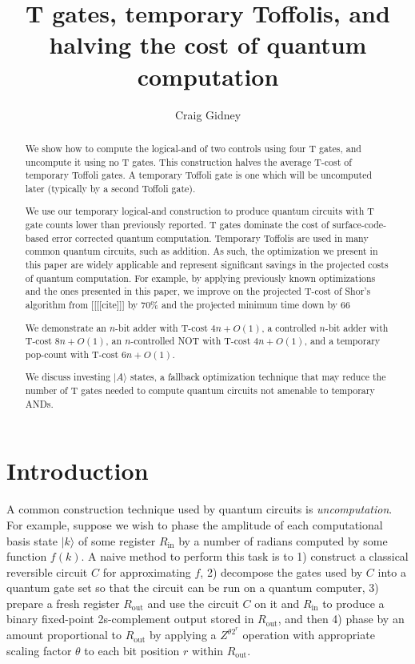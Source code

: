 \documentclass[twocolumn,longbibliography]{quantumarticle-customized}
\title{T gates, temporary Toffolis, and halving the cost of quantum computation}
\author{Craig Gidney}
\affiliation{Google, Santa Barbara, CA 93117, USA}
\begin{document}
\maketitle

\begin{abstract}
We show how to compute the logical-and of two controls using four T gates, and uncompute it using no T gates.
This construction halves the average T-cost of temporary Toffoli gates.
A temporary Toffoli gate is one which will be uncomputed later (typically by a second Toffoli gate).

We use our temporary logical-and construction to produce quantum circuits with T gate counts lower than previously reported.
T gates dominate the cost of surface-code-based error corrected quantum computation.
Temporary Toffolis are used in many common quantum circuits, such as addition.
As such, the optimization we present in this paper are widely applicable and represent significant savings in the projected costs of quantum computation.
For example, by applying previously known optimizations and the ones presented in this paper, we improve on the projected T-cost of Shor's algorithm from [[[[cite]]] by 70\% and the projected minimum time down by 66%

We demonstrate an $n$-bit adder with T-cost $4n + O(1)$, a controlled $n$-bit adder with T-cost $8n + O(1)$, an $n$-controlled NOT with T-cost $4n + O(1)$, and a temporary pop-count with T-cost $6n + O(1)$.

We discuss investing $|A\rangle$ states, a fallback optimization technique that may reduce the number of T gates needed to compute quantum circuits not amenable to temporary ANDs.
\end{abstract}


\section{Introduction}
\label{sec:introduction}

A common construction technique used by quantum circuits is {\em uncomputation}.
For example, suppose we wish to phase the amplitude of each computational basis state $|k\rangle$ of some register $R_{\text{in}}$ by a number of radians computed by some function $f(k)$.
A naive method to perform this task is to 1) construct a classical reversible circuit $C$ for approximating $f$, 2) decompose the gates used by $C$ into a quantum gate set so that the circuit can be run on a quantum computer, 3) prepare a fresh register $R_\text{out}$ and use the circuit $C$ on it and $R_\text{in}$ to produce a binary fixed-point 2s-complement output stored in $R_{\text{out}}$, and then 4) phase by an amount proportional to $R_\text{out}$ by applying a $Z^{\theta 2^r}$ operation with appropriate scaling factor $\theta$ to each bit position $r$ within $R_\text{out}$.
\end{document}

